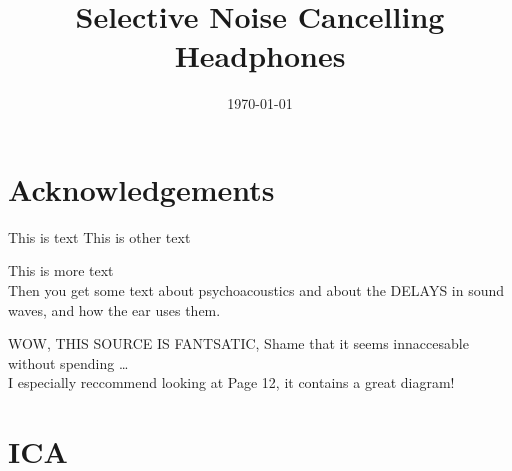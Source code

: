 \documentclass{ecsproject}
\title{Selective Noise Cancelling Headphones}
\date{\today}
\begin{document}
\maketitle

\chapter*{Acknowledgements}


This is text \cite{EMHeadsets}
This is other text \cite{EMNoiseCancel}

This is more \cite{ICAAlg&Apps} text\\
Then you get some text about psychoacoustics \cite{MusCogCompSou} and about the DELAYS in sound waves, and how the ear uses them.

WOW, THIS SOURCE\cite{AdvancedDSPing} IS FANTSATIC, Shame that it seems innaccesable without spending \ldots \\
I especially reccommend looking at Page 12, it contains a great diagram!




\appendix
\chapter{ICA}

\end{document}
